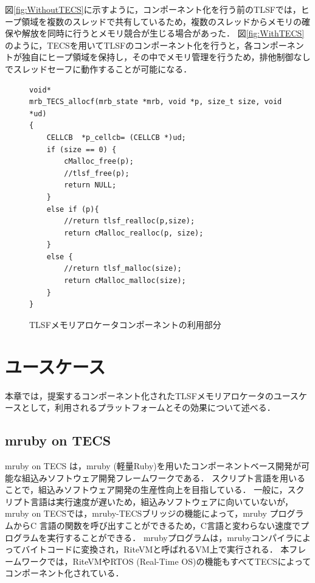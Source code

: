 \documentclass[submit,techrep]{ipsj_v2/UTF8/ipsj}
\begin{document}
図\ref{fig:WithoutTECS}に示すように，コンポーネント化を行う前のTLSFでは，ヒープ領域を複数のスレッドで共有しているため，複数のスレッドからメモリの確保や解放を同時に行うとメモリ競合が生じる場合があった．
図\ref{fig:WithTECS}のように，TECSを用いてTLSFのコンポーネント化を行うと，各コンポーネントが独自にヒープ領域を保持し，その中でメモリ管理を行うため，排他制御なしでスレッドセーフに動作することが可能になる．

\begin{figure}[t]
\centering
\begin{lstlisting}
void*
mrb_TECS_allocf(mrb_state *mrb, void *p, size_t size, void *ud)
{
    CELLCB	*p_cellcb= (CELLCB *)ud;
    if (size == 0) {
        cMalloc_free(p);
        //tlsf_free(p);
        return NULL;
    }
    else if (p){
        //return tlsf_realloc(p,size);
        return cMalloc_realloc(p, size);
    }
    else {
        //return tlsf_malloc(size);
        return cMalloc_malloc(size);
    }
}
\end{lstlisting}
\caption{TLSFメモリアロケータコンポーネントの利用部分}  
\label{src:TLSFC}
\end{figure}


\section{ユースケース}
\label{sec:UseCase}

本章では，提案するコンポーネント化されたTLSFメモリアロケータのユースケースとして，利用されるプラットフォームとその効果について述べる．

\subsection{mruby on TECS}
\label{sec:mrubyonTECS}

mruby on TECS は，mruby (軽量Ruby)\cite{par:mruby}\cite{url:mruby}を用いたコンポーネントベース開発が可能な組込みソフトウェア開発フレームワークである\cite{par:mrubyonTECS}．
スクリプト言語を用いることで，組込みソフトウェア開発の生産性向上を目指している．
一般に，スクリプト言語は実行速度が遅いため，組込みソフトウェアに向いていないが，mruby on TECSでは，mruby-TECSブリッジの機能によって，mruby プログラムからC 言語の関数を呼び出すことができるため，C言語と変わらない速度でプログラムを実行することができる．
mrubyプログラムは，mrubyコンパイラによってバイトコードに変換され，RiteVMと呼ばれるVM上で実行される．
本フレームワークでは，RiteVMやRTOS (Real-Time OS)の機能もすべてTECSによってコンポーネント化されている．
\end{document}
